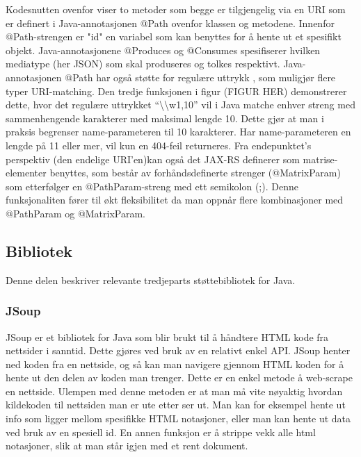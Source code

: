 \documentclass[../main.tex]{subfiles}
\begin{document}
Kodesnutten ovenfor viser to metoder som begge er tilgjengelig via en URI som er definert i Java-annotasjonen @Path ovenfor klassen og metodene. Innenfor @Path-strengen er "{id}" en variabel som kan benyttes for å hente ut et spesifikt objekt. Java-annotasjonene @Produces og @Consumes spesifiserer hvilken mediatype (her JSON) som skal produseres og tolkes respektivt.
Java-annotasjonen @Path har også støtte for regulære uttrykk , som muligjør flere typer URI-matching. Den tredje funksjonen i figur (FIGUR HER) demonstrerer dette, hvor det regulære uttrykket “\textbackslash\textbackslash w{1,10}” vil i Java matche enhver streng med sammenhengende karakterer med maksimal lengde 10. Dette gjør at man i praksis begrenser {name}-parameteren til 10 karakterer. Har {name}-parameteren en lengde på 11 eller mer, vil kun en 404-feil returneres.\newline
Fra endepunktet’s perspektiv (den endelige URI’en)kan også det JAX-RS definerer som matrise-elementer benyttes, som består av forhåndsdefinerte strenger (@MatrixParam) som etterfølger en @PathParam-streng med ett semikolon (;). Denne funksjonaliten fører til økt fleksibilitet da man oppnår flere kombinasjoner med @PathParam og @MatrixParam.

\subsection{Bibliotek}

Denne delen beskriver relevante tredjeparts støttebibliotek for Java.

\subsubsection{JSoup}

JSoup er et bibliotek for Java som blir brukt til å håndtere HTML kode fra nettsider i sanntid. Dette gjøres ved bruk av en relativt enkel API. JSoup henter ned koden fra en nettside, og så kan man navigere gjennom HTML koden for å hente ut den delen av koden man trenger.  Dette er en enkel metode å web-scrape en nettside. Ulempen med denne metoden er at man må vite nøyaktig hvordan kildekoden til nettsiden man er ute etter ser ut. Man kan for eksempel hente ut info som ligger mellom spesifikke HTML notasjoner, eller man kan hente ut data ved bruk av en spesiell id. En annen funksjon er å strippe vekk alle html notasjoner, slik at man står igjen med et rent dokument. 
\end{document}
